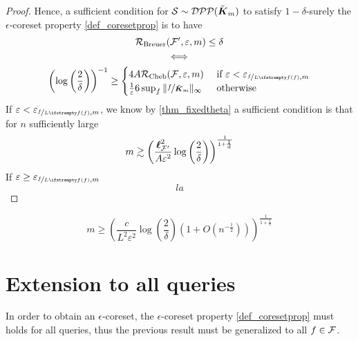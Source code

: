 \begin{proof}
	
	
	Hence, a sufficient condition for $\mathcal{S} \sim \mathcal{DPP}(\tilde{\boldsymbol K}_{m})$ to satisfy $1-\delta$-surely the $\epsilon$-coreset property \ref{def_coresetprop} is to have
	\begin{gather*}
		\boundrate_{\textrm{Breuer}}(\queryset', \epsilon,m) \leq \delta\\
		\iff \\
		\left(\log \left( \frac{2}{\delta }\right)\right)^{-1} \geq
		\begin{cases}
			4 A \boundrate_{\textrm{Cheb}}(\queryset, \epsilon, m)
			& \text { if } \epsilon<\epsilon_{\nicefrac{\query}{\loss{\query}}, m}\\
			\frac{1}{\epsilon} 6\sup_{\query}\|\nicefrac{\query}{\opekernel{m}}\|_{\infty}
			& \text { otherwise }
		\end{cases}
	\end{gather*}
	If $\epsilon<\epsilon_{\nicefrac{\query}{\loss{\query}}, m}$, we know by \ref{thm_fixedtheta} a sufficient condition is that for $n$ sufficiently large 
	\begin{equation*}
		m \gtrsim \left(\frac{\boldsymbol\ell^2_{\mathcal{F}'}}{A\varepsilon^2} \log \left( \frac{2}{\delta }\right) \right)^{\frac{1}{1+\frac 1 d}}
	\end{equation*}
	If $\epsilon\geq\epsilon_{\nicefrac{\query}{\loss{\query}}, m}$
	\begin{equation*}
		la
	\end{equation*}


\end{proof}
	
		 
		 
		 
	  $$m \geq \left( \frac{c}{L^{2}\varepsilon ^{2}}\log \left( \frac{2}{\delta }\right) \left( 1+O\left( n^{-\frac{1}{2}}\right) \right) \right) ^{\frac{1}{1+\frac{1}{d}}}$$
	


\section{Extension to all queries}
In order to obtain an $\epsilon$-coreset, the $\epsilon$-coreset property \ref{def_coresetprop} must holds for all queries, thus the previous result must be generalized to all $f \in \mathcal{F}$.

